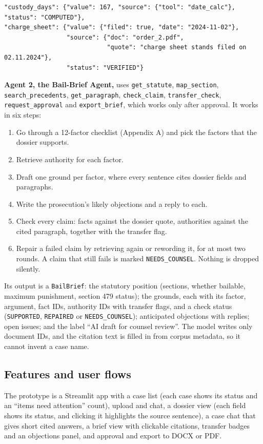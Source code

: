 \documentclass[11pt,a4paper]{article}
\newcommand{\st}[1]{\texttt{\small #1}}
\begin{document}
{\footnotesize
\begin{verbatim}
"custody_days": {"value": 167, "source": {"tool": "date_calc"}, "status": "COMPUTED"},
"charge_sheet": {"value": {"filed": true, "date": "2024-11-02"},
                 "source": {"doc": "order_2.pdf",
                            "quote": "charge sheet stands filed on 02.11.2024"},
                 "status": "VERIFIED"}
\end{verbatim}
}

\textbf{Agent 2, the Bail-Brief Agent,} uses \st{get\_statute}, \st{map\_section}, \st{search\_precedents}, \st{get\_paragraph}, \st{check\_claim}, \st{transfer\_check}, \st{request\_approval} and \st{export\_brief}, which works only after approval. It works in six steps:
\begin{enumerate}
\item Go through a 12-factor checklist (Appendix A) and pick the factors that the dossier supports.
\item Retrieve authority for each factor.
\item Draft one ground per factor, where every sentence cites dossier fields and paragraphs.
\item Write the prosecution's likely objections and a reply to each.
\item Check every claim: facts against the dossier quote, authorities against the cited paragraph, together with the transfer flag.
\item Repair a failed claim by retrieving again or rewording it, for at most two rounds. A claim that still fails is marked \st{NEEDS\_COUNSEL}. Nothing is dropped silently.
\end{enumerate}
Its output is a \st{BailBrief}: the statutory position (sections, whether bailable, maximum punishment, section 479 status); the grounds, each with its factor, argument, fact IDs, authority IDs with transfer flags, and a check status (\st{SUPPORTED}, \st{REPAIRED} or \st{NEEDS\_COUNSEL}); anticipated objections with replies; open issues; and the label ``AI draft for counsel review''. The model writes only document IDs, and the citation text is filled in from corpus metadata, so it cannot invent a case name.

\subsection{Features and user flows}

The prototype is a Streamlit app with a case list (each case shows its status and an ``items need attention'' count), upload and chat, a dossier view (each field shows its status, and clicking it highlights the source sentence), a case chat that gives short cited answers, a brief view with clickable citations, transfer badges and an objections panel, and approval and export to DOCX or PDF.
\end{document}
